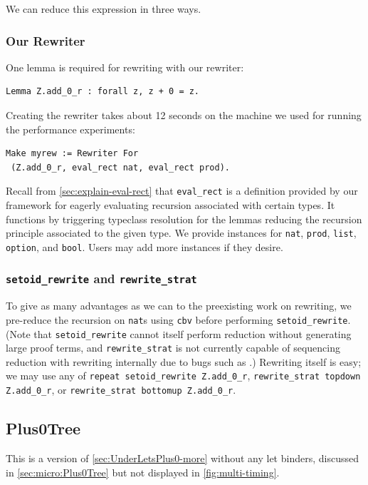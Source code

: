 \begin{subappendices}
We can reduce this expression in three ways.

\subsubsection{Our Rewriter}
One lemma is required for rewriting with our rewriter:
\begin{verbatim}
Lemma Z.add_0_r : forall z, z + 0 = z.
\end{verbatim}

Creating the rewriter takes about 12 seconds on the machine we used for running the performance experiments:
\begin{verbatim}
Make myrew := Rewriter For
 (Z.add_0_r, eval_rect nat, eval_rect prod).
\end{verbatim}
Recall from \autoref{sec:explain-eval-rect} that \texttt{eval_rect} is a definition provided by our framework for eagerly evaluating recursion associated with certain types.
It functions by triggering typeclass resolution for the lemmas reducing the recursion principle associated to the given type.
We provide instances for \texttt{nat}, \texttt{prod}, \texttt{list}, \texttt{option}, and \texttt{bool}.
Users may add more instances if they desire.

\subsubsection{\texorpdfstring{\texttt{setoid\protect\_rewrite}}{setoid\_rewrite} and \texorpdfstring{\texttt{rewrite\protect\_strat}}{rewrite\_strat}}
To give as many advantages as we can to the preexisting work on rewriting, we pre-reduce the recursion on \texttt{nat}s using \texttt{cbv} before performing \texttt{setoid\_rewrite}.
(Note that \texttt{setoid\_rewrite} cannot itself perform reduction without generating large proof terms, and \texttt{rewrite\_strat} is not currently capable of sequencing reduction with rewriting internally due to bugs such as .)
Rewriting itself is easy; we may use any of \texttt{repeat setoid\_rewrite Z.add\_0\_r}, \texttt{rewrite\_strat topdown Z.add\_0\_r}, or \texttt{rewrite\_strat bottomup Z.add\_0\_r}.

\subsection{Plus0Tree} \label{sec:Plus0Tree-more}

This is a version of \autoref{sec:UnderLetsPlus0-more} without any let binders, discussed in \autoref{sec:micro:Plus0Tree} but not displayed in \autoref{fig:multi-timing}.


\end{subappendices}
